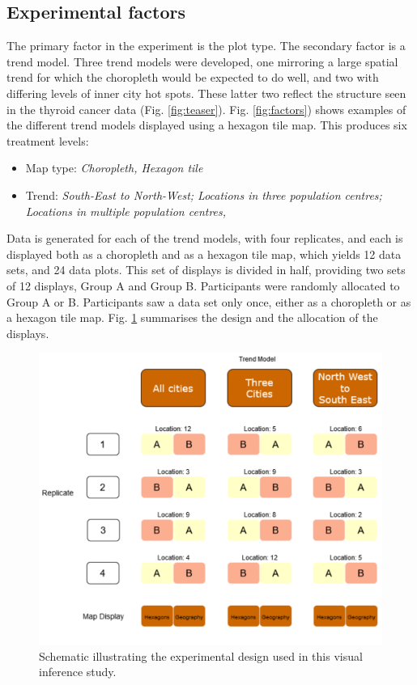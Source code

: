 \documentclass[journal]{vgtc}                     %
\begin{document}
\hypertarget{experimental-factors}{%
\subsection{Experimental factors}\label{experimental-factors}}

The primary factor in the experiment is the plot type. The secondary factor is a trend model. Three trend models were developed, one mirroring a large spatial trend for which the choropleth would be expected to do well, and two with differing levels of inner city hot spots. These latter two reflect the structure seen in the thyroid cancer data (Fig. \ref{fig:teaser}). Fig. \ref{fig:factors}) shows examples of the different trend models displayed using a hexagon tile map. This produces six treatment levels:

\begin{itemize} \itemsep 0in
\item
  Map type: \emph{Choropleth, Hexagon tile}
\item
  Trend: \emph{South-East to North-West; Locations in three population centres; Locations in multiple population centres, }
\end{itemize}

Data is generated for each of the trend models, with four replicates, and each is displayed both as a choropleth and as a hexagon tile map, which yields 12 data sets, and 24 data plots. This set of displays is divided in half, providing two sets of 12 displays, Group A and Group B. Participants were randomly allocated to Group A or B. Participants saw a data set only once, either as a choropleth or as a hexagon tile map. Fig. \ref{fig:exp-design} summarises the design and the allocation of the displays.

\begin{figure}[h]
\includegraphics[width=1\linewidth]{paper_files/figure-latex/exp-design-1} \caption{Schematic illustrating the experimental design used in this visual inference study.}\label{fig:exp-design}
\end{figure}
\end{document}
